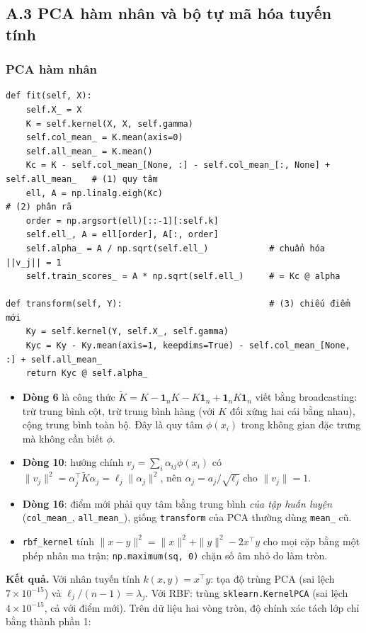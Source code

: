 \documentclass[11pt,a4paper]{article}
\newcommand{\code}[1]{\texttt{#1}}
\begin{document}
\subsection{A.3 PCA hàm nhân và bộ tự mã hóa tuyến tính}
\subsubsection*{PCA hàm nhân}
\begin{verbatim}
def fit(self, X):
    self.X_ = X
    K = self.kernel(X, X, self.gamma)
    self.col_mean_ = K.mean(axis=0)
    self.all_mean_ = K.mean()
    Kc = K - self.col_mean_[None, :] - self.col_mean_[:, None] + self.all_mean_   # (1) quy tâm
    ell, A = np.linalg.eigh(Kc)                                                 # (2) phân rã
    order = np.argsort(ell)[::-1][:self.k]
    self.ell_, A = ell[order], A[:, order]
    self.alpha_ = A / np.sqrt(self.ell_)            # chuẩn hóa ||v_j|| = 1
    self.train_scores_ = A * np.sqrt(self.ell_)     # = Kc @ alpha

def transform(self, Y):                             # (3) chiếu điểm mới
    Ky = self.kernel(Y, self.X_, self.gamma)
    Kyc = Ky - Ky.mean(axis=1, keepdims=True) - self.col_mean_[None, :] + self.all_mean_
    return Kyc @ self.alpha_
\end{verbatim}
\begin{itemize}
\item \textbf{Dòng 6} là công thức $\tilde K=K-\mathbf 1_nK-K\mathbf 1_n+\mathbf 1_nK\mathbf 1_n$ viết bằng broadcasting: trừ trung bình cột, trừ trung bình hàng (với $K$ đối xứng hai cái bằng nhau), cộng trung bình toàn bộ. Đây là quy tâm $\phi(x_i)$ trong không gian đặc trưng mà không cần biết $\phi$.
\item \textbf{Dòng 10}: hướng chính $v_j=\sum_i\alpha_{ij}\phi(x_i)$ có $\|v_j\|^2=\alpha_j^\top\tilde K\alpha_j=\ell_j\|\alpha_j\|^2$, nên $\alpha_j=a_j/\sqrt{\ell_j}$ cho $\|v_j\|=1$.
\item \textbf{Dòng 16}: điểm mới phải quy tâm bằng trung bình \emph{của tập huấn luyện} (\code{col\_mean\_}, \code{all\_mean\_}), giống \code{transform} của PCA thường dùng \code{mean\_} cũ.
\item \code{rbf\_kernel} tính $\|x-y\|^2=\|x\|^2+\|y\|^2-2x^\top y$ cho mọi cặp bằng một phép nhân ma trận; \code{np.maximum(sq, 0)} chặn số âm nhỏ do làm tròn.
\end{itemize}
\textbf{Kết quả.} Với nhân tuyến tính $k(x,y)=x^\top y$: tọa độ trùng PCA (sai lệch $7\times10^{-15}$) và $\ell_j/(n-1)=\lambda_j$. Với RBF: trùng \code{sklearn.KernelPCA} (sai lệch $4\times10^{-15}$, cả với điểm mới). Trên dữ liệu hai vòng tròn, độ chính xác tách lớp chỉ bằng thành phần 1:
\end{document}
